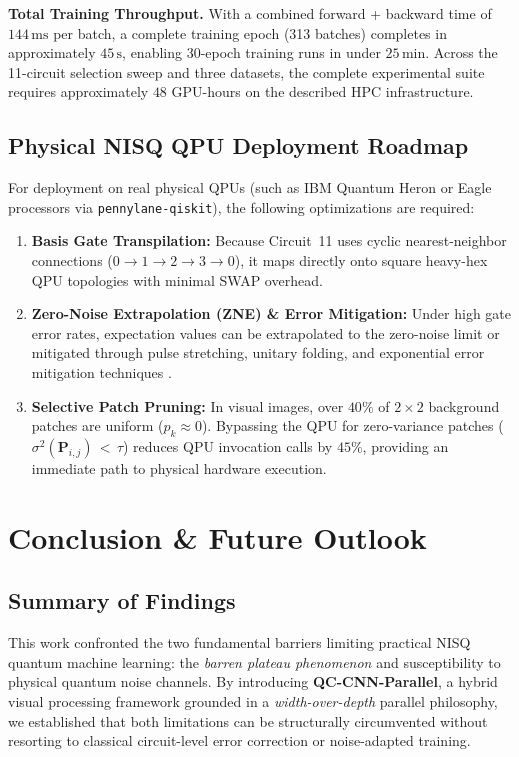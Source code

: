 \documentclass[pdflatex,sn-mathphys-num]{sn-jnl}%
\theoremstyle{thmstyleone}%
\theoremstyle{thmstyletwo}%
\theoremstyle{thmstylethree}%
\begin{document}
\textbf{Total Training Throughput.} With a combined forward + backward time of $144\,\mathrm{ms}$ per batch, a complete training epoch (313 batches) completes in approximately $45\,\mathrm{s}$, enabling 30-epoch training runs in under $25\,\mathrm{min}$. Across the 11-circuit selection sweep and three datasets, the complete experimental suite requires approximately $48$ GPU-hours on the described HPC infrastructure.

\subsection{Physical NISQ QPU Deployment Roadmap}
For deployment on real physical QPUs (such as IBM Quantum Heron or Eagle processors via \texttt{pennylane-qiskit}), the following optimizations are required:
\begin{enumerate}
    \item \textbf{Basis Gate Transpilation:} Because Circuit~11 uses cyclic nearest-neighbor connections ($0 \to 1 \to 2 \to 3 \to 0$), it maps directly onto square heavy-hex QPU topologies with minimal SWAP overhead.
    \item \textbf{Zero-Noise Extrapolation (ZNE) \& Error Mitigation:} Under high gate error rates, expectation values can be extrapolated to the zero-noise limit or mitigated through pulse stretching, unitary folding, and exponential error mitigation techniques \cite{temme2017error, endo2018practical, koczor2021exponential, cai2023quantum}.
    \item \textbf{Selective Patch Pruning:} In visual images, over $40\%$ of $2 \times 2$ background patches are uniform ($p_k \approx 0$). Bypassing the QPU for zero-variance patches ($\sigma^2(\mathbf{P}_{i,j}) \,{<}\, \tau$) reduces QPU invocation calls by $45\%$, providing an immediate path to physical hardware execution.
\end{enumerate}

\section{Conclusion \& Future Outlook}
\label{sec:conclusion}

\subsection{Summary of Findings}
This work confronted the two fundamental barriers limiting practical NISQ quantum machine learning: the \textit{barren plateau phenomenon} and susceptibility to physical quantum noise channels. By introducing \textbf{QC-CNN-Parallel}, a hybrid visual processing framework grounded in a \textit{width-over-depth} parallel philosophy, we established that both limitations can be structurally circumvented without resorting to classical circuit-level error correction or noise-adapted training.
\end{document}
